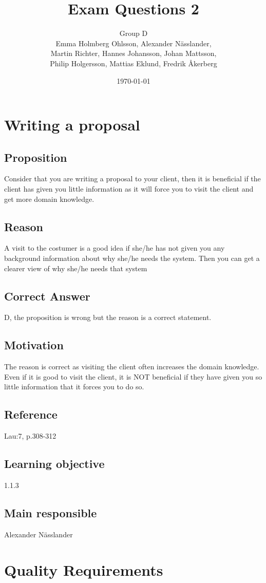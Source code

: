 \documentclass[a4paper]{article}
\title{Exam Questions 2}
\author{Group D\\ Emma Holmberg Ohlsson, Alexander Nässlander,\\Martin Richter, Hannes Johansson, Johan Mattsson,\\Philip Holgersson, Mattias Eklund, Fredrik Åkerberg}
\date{\today}
\begin{document}
	\maketitle
	\thispagestyle{empty}
	\setcounter{page}{0}
	\pagebreak

\section{Writing a proposal}
\subsection*{Proposition}
Consider that you are writing a proposal to your client, then it is beneficial if the client has given you little information as it will force you to visit the client and get more domain knowledge.  
\subsection*{Reason}
A visit to the costumer is a good idea if she/he has not given you any background information about why she/he needs the system. Then you can get a clearer view of why she/he needs that system
\subsection*{Correct Answer}
D, the proposition is wrong but the reason is a correct statement.
\subsection*{Motivation}
The reason is correct as visiting the client often increases the domain knowledge. Even if it is good to visit the client, it is NOT beneficial if they have given you so little information that it forces you to do so.
\subsection*{Reference}
Lau:7, p.308-312
\subsection*{Learning objective}
1.1.3 
\subsection*{Main responsible}
Alexander Nässlander

\section{Quality Requirements}
\end{document}
